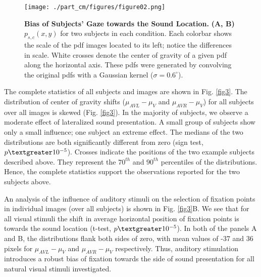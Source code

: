 \begin{figure}[!htbp] 
\centerline{ \texttt{[image: ./part\_cm/figures/figure02.png]}} 

\caption[Bias of Subjects' Gaze towards the Sound Location.] {\textbf{Bias
of Subjects' Gaze towards the Sound Location.} \textbf{(A, B)}
$p_{s,c}(x,y)$ for two subjects in each condition. Each colorbar shows the
scale of the pdf images located to its left; notice the differences in
scale. White crosses denote the center of gravity of a given pdf along the
horizontal axis. These pdfs were generated by convolving the original pdfs
with a Gaussian kernel ($\sigma = 0.6^{\circ}$).} \label{fig2} \end{figure}

The complete statistics of all subjects and images are shown in Fig. \ref{fig3}.
The distribution of center of gravity shifts ($\mu_{AVL}-\mu_{V}$ and
$\mu_{AVR}-\mu_{V}$) for all subjects over all images is skewed
(Fig. \ref{fig3}). In the majority of subjects, we observe a moderate effect of
lateralized sound presentation. A small group of subjects show only a small
influence; one subject an extreme effect. The medians of the two
distributions are both significantly different from zero (sign test, $p
\textgreater 10^{-5}$). Crosses indicate the positions of the two example
subjects described above. They represent the $70^{th}$ and $90^{th}$
percentiles of the distributions. Hence, the complete statistics support
the observations reported for the two subjects above. 

An analysis of the influence of auditory stimuli on the selection of
fixation points in individual images (over all subjects) is shown in
Fig. \ref{fig3}B. We see that for all visual stimuli the shift in average
horizontal position of fixation points is towards the sound location
(t-test, $p \textgreater 10^{-5}$). In both of the panels A and B, the
distributions flank both sides of zero, with mean values of -37 and 36
pixels for $\mu_{AVL}-\mu_{V}$ and $\mu_{AVR}-\mu_{V}$ respectively. Thus,
auditory stimulation introduces a robust bias of fixation towards the side
of sound presentation for all natural visual stimuli investigated. 

